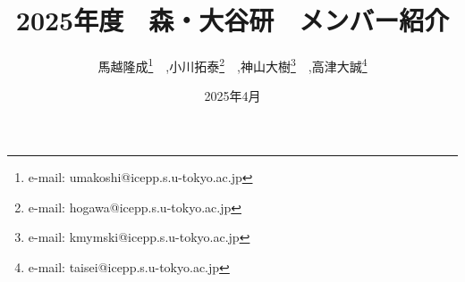 \title{2025年度　森・大谷研　メンバー紹介}
\date{2025年4月} %
\author{馬越隆成\footnote{e-mail: umakoshi@icepp.s.u-tokyo.ac.jp}　,小川拓泰\footnote{e-mail: hogawa@icepp.s.u-tokyo.ac.jp}　,神山大樹\footnote{e-mail: kmymski@icepp.s.u-tokyo.ac.jp}　,高津大誠\footnote{e-mail: taisei@icepp.s.u-tokyo.ac.jp}} %
\seifuku{} %
